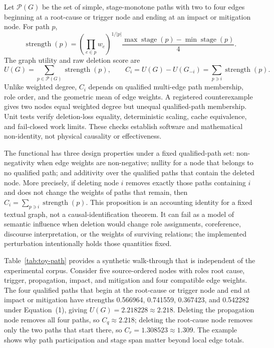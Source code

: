 \documentclass[applsci,article,submit,moreauthors]{Definitions/mdpi}
\begin{document}
Let $\mathcal{P}(G)$ be the set of simple, stage-monotone paths with two to four edges beginning at a root-cause or trigger node and ending at an impact or mitigation node. For path $p$,
\begin{equation}
\operatorname{strength}(p)=\left(\prod_{e\in p}w_e\right)^{1/|p|}\frac{\max\operatorname{stage}(p)-\min\operatorname{stage}(p)}{4}.
\end{equation}
The graph utility and raw deletion score are
\begin{equation}
U(G)=\sum_{p\in\mathcal{P}(G)}\operatorname{strength}(p),\qquad
C_i=U(G)-U(G_{-i})=\sum_{p\ni i}\operatorname{strength}(p).
\end{equation}
Unlike weighted degree, $C_i$ depends on qualified multi-edge path membership, role order, and the geometric mean of edge weights. A registered counterexample gives two nodes equal weighted degree but unequal qualified-path membership. Unit tests verify deletion-loss equality, deterministic scaling, cache equivalence, and fail-closed work limits. These checks establish software and mathematical non-identity, not physical causality or effectiveness.

The functional has three design properties under a fixed qualified-path set: non-negativity when edge weights are non-negative; nullity for a node that belongs to no qualified path; and additivity over the qualified paths that contain the deleted node. More precisely, if deleting node $i$ removes exactly those paths containing $i$ and does not change the weights of paths that remain, then $C_i=\sum_{p\ni i}\operatorname{strength}(p)$. This proposition is an accounting identity for a fixed textual graph, not a causal-identification theorem. It can fail as a model of semantic influence when deletion would change role assignments, coreference, discourse interpretation, or the weights of surviving relations; the implemented perturbation intentionally holds those quantities fixed.

Table~\ref{tab:toy-path} provides a synthetic walk-through that is independent of the experimental corpus. Consider five source-ordered nodes with roles root cause, trigger, propagation, impact, and mitigation and four compatible edge weights. The four qualified paths that begin at the root-cause or trigger node and end at impact or mitigation have strengths 0.566964, 0.741559, 0.367423, and 0.542282 under Equation~(1), giving $U(G)=2.218228\approx2.218$. Deleting the propagation node removes all four paths, so $C_{q}\approx2.218$; deleting the root-cause node removes only the two paths that start there, so $C_{r}=1.308523\approx1.309$. The example shows why path participation and stage span matter beyond local edge totals.
\end{document}
